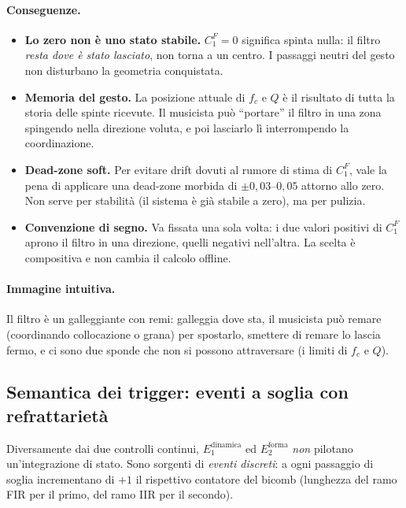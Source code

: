 \documentclass[a4paper,11pt]{article}
\begin{document}
\paragraph{Conseguenze.}
\begin{itemize}[nosep]
  \item \textbf{Lo zero non è uno stato stabile.} $C_1^F = 0$ significa
        spinta nulla: il filtro \emph{resta dove è stato lasciato}, non
        torna a un centro. I passaggi neutri del gesto non disturbano
        la geometria conquistata.
  \item \textbf{Memoria del gesto.} La posizione attuale di $f_c$ e $Q$
        è il risultato di tutta la storia delle spinte ricevute. Il
        musicista può ``portare'' il filtro in una zona spingendo nella
        direzione voluta, e poi lasciarlo lì interrompendo la
        coordinazione.
  \item \textbf{Dead-zone soft.} Per evitare drift dovuti al rumore di
        stima di $C_1^F$, vale la pena di applicare una dead-zone
        morbida di $\pm 0{,}03$--$0{,}05$ attorno allo zero. Non serve
        per stabilità (il sistema è già stabile a zero), ma per pulizia.
  \item \textbf{Convenzione di segno.} Va fissata una sola volta: i due
        valori positivi di $C_1^F$ aprono il filtro in una direzione,
        quelli negativi nell'altra. La scelta è compositiva e non
        cambia il calcolo offline.
\end{itemize}

\paragraph{Immagine intuitiva.}
Il filtro è un galleggiante con remi: galleggia dove sta, il musicista
può remare (coordinando collocazione o grana) per spostarlo,
smettere di remare lo lascia fermo, e ci sono due sponde che non si
possono attraversare (i limiti di $f_c$ e $Q$).

\subsection{Semantica dei trigger: eventi a soglia con refrattarietà}

Diversamente dai due controlli continui, $E_1^{\text{dinamica}}$ ed
$E_2^{\text{forma}}$ \emph{non} pilotano un'integrazione di stato. Sono
sorgenti di \emph{eventi discreti}: a ogni passaggio di soglia
incrementano di $+1$ il rispettivo contatore del bicomb (lunghezza del
ramo FIR per il primo, del ramo IIR per il secondo).
\end{document}
